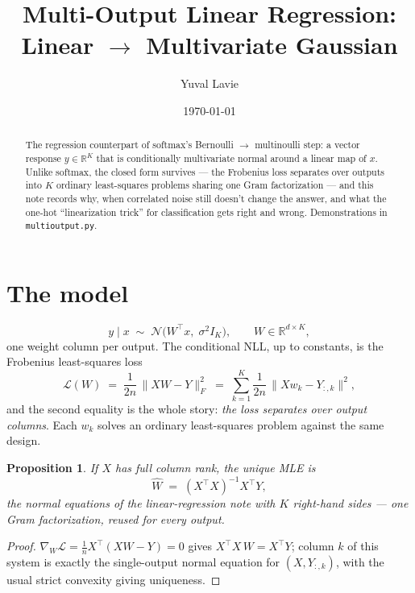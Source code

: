 \documentclass[11pt]{article}
\title{Multi-Output Linear Regression:\\
Linear $\to$ Multivariate Gaussian}
\author{Yuval Lavie}
\date{\today}
\newtheorem{proposition}{Proposition}
\begin{document}
\maketitle

\begin{abstract}
The regression counterpart of softmax's Bernoulli $\to$ multinoulli step:
a vector response $y \in \mathbb{R}^K$ that is conditionally multivariate
normal around a linear map of $x$. Unlike softmax, the closed form
survives --- the Frobenius loss separates over outputs into $K$ ordinary
least-squares problems sharing one Gram factorization --- and this note
records why, when correlated noise still doesn't change the answer, and
what the one-hot ``linearization trick'' for classification gets right
and wrong. Demonstrations in \texttt{multioutput.py}.
\end{abstract}

\section{The model}

\begin{equation}
  y \mid x \;\sim\; \mathcal{N}\bigl(W^\top x,\; \sigma^2 I_K\bigr),
  \qquad W \in \mathbb{R}^{d\times K},
  \label{eq:model}
\end{equation}
one weight column per output. The conditional NLL, up to constants, is
the Frobenius least-squares loss
\begin{equation}
  \mathcal{L}(W) \;=\; \frac{1}{2n}\,\lVert XW - Y\rVert_F^2
  \;=\; \sum_{k=1}^{K} \frac{1}{2n}\,\lVert Xw_k - Y_{:,k}\rVert^2 ,
  \label{eq:loss}
\end{equation}
and the second equality is the whole story: \emph{the loss separates over
output columns}. Each $w_k$ solves an ordinary least-squares problem
against the same design.

\begin{proposition}
If $X$ has full column rank, the unique MLE is
\begin{equation}
  \boxed{\;\widehat{W} \;=\; (X^\top X)^{-1} X^\top Y ,\;}
  \label{eq:closed}
\end{equation}
the normal equations of the linear-regression note with $K$ right-hand
sides --- one Gram factorization, reused for every output.
\end{proposition}

\begin{proof}
$\nabla_W \mathcal{L} = \tfrac1n X^\top (XW - Y) = 0$ gives
$X^\top X\, W = X^\top Y$; column $k$ of this system is exactly the
single-output normal equation for $(X, Y_{:,k})$, with the usual strict
convexity giving uniqueness.
\end{proof}
\end{document}
